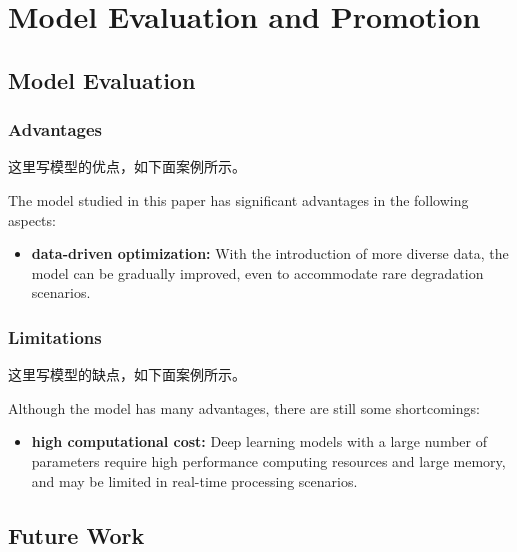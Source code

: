 \documentclass{apmcmthesis}                                             %
\begin{document}
\newpage
\section{Model Evaluation and Promotion}
\subsection{Model Evaluation}

\subsubsection{Advantages}

这里写模型的优点，如下面案例所示。

The model studied in this paper has significant advantages in the following aspects:

\begin{itemize}

\item \textbf{data-driven optimization:} With the introduction of more diverse data, the model can be gradually improved, even to accommodate rare degradation scenarios.
\end{itemize}



\subsubsection{Limitations}

这里写模型的缺点，如下面案例所示。

Although the model has many advantages, there are still some shortcomings:

\begin{itemize}
\item \textbf{high computational cost:} Deep learning models with a large number of parameters require high performance computing resources and large memory, and may be limited in real-time processing scenarios.
\end{itemize}


\subsection{Future Work}
\end{document}
